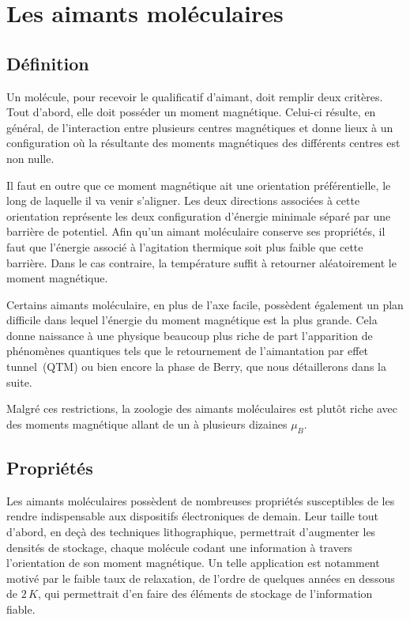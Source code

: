 \chapter{Les aimants moléculaires}
\section{Définition}

Un molécule, pour recevoir le qualificatif d'aimant, doit remplir deux critères. Tout d'abord, elle doit posséder un moment magnétique. Celui-ci résulte, en général, de l'interaction entre plusieurs centres magnétiques et donne lieux à un configuration où la résultante des moments magnétiques des différents centres est non nulle. 

Il faut en outre que ce moment magnétique ait une orientation préférentielle, le long de laquelle il va venir s'aligner. Les deux directions associées à cette orientation représente les deux configuration d'énergie minimale séparé par une barrière de potentiel. Afin qu'un aimant moléculaire conserve ses propriétés, il faut que l'énergie associé à l'agitation thermique soit plus faible que cette barrière. Dans le cas contraire, la température suffit à retourner aléatoirement le moment magnétique.

Certains aimants moléculaire, en plus de l'axe facile, possèdent également un plan difficile dans lequel l'énergie du moment magnétique est la plus grande. Cela donne naissance à une physique beaucoup plus riche de part l'apparition de phénomènes quantiques tels que le retournement de l'aimantation par effet tunnel~(QTM) ou bien encore la phase de Berry, que nous détaillerons dans la suite.

Malgré ces restrictions, la zoologie des aimants moléculaires est plutôt riche avec des moments magnétique allant de un à plusieurs dizaines $\mu_B$.


\section{Propriétés}
Les aimants moléculaires possèdent de nombreuses propriétés susceptibles de les rendre indispensable aux dispositifs électroniques de demain. Leur taille tout d'abord, en deçà des techniques lithographique, permettrait d'augmenter les densités de stockage, chaque molécule codant une information à travers l'orientation de son moment magnétique. Un telle application est notamment motivé par le faible taux de relaxation, de l'ordre de quelques années en dessous de $2\,K$, qui permettrait d'en faire des éléments de stockage de l'information fiable.

